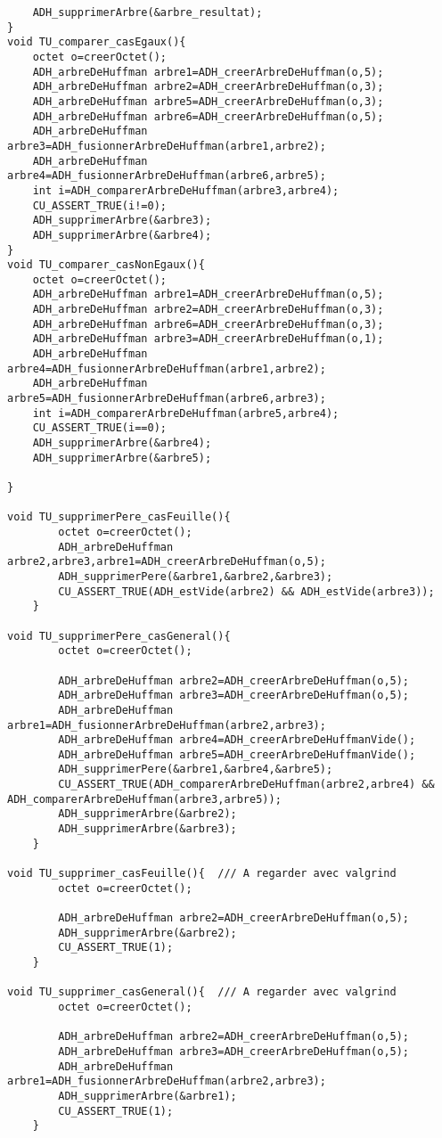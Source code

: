 \begin{verbatim}
	ADH_supprimerArbre(&arbre_resultat);
}
void TU_comparer_casEgaux(){
    octet o=creerOctet();
    ADH_arbreDeHuffman arbre1=ADH_creerArbreDeHuffman(o,5);
    ADH_arbreDeHuffman arbre2=ADH_creerArbreDeHuffman(o,3);
    ADH_arbreDeHuffman arbre5=ADH_creerArbreDeHuffman(o,3);
    ADH_arbreDeHuffman arbre6=ADH_creerArbreDeHuffman(o,5);
    ADH_arbreDeHuffman arbre3=ADH_fusionnerArbreDeHuffman(arbre1,arbre2);
    ADH_arbreDeHuffman arbre4=ADH_fusionnerArbreDeHuffman(arbre6,arbre5);
    int i=ADH_comparerArbreDeHuffman(arbre3,arbre4);
    CU_ASSERT_TRUE(i!=0);
	ADH_supprimerArbre(&arbre3);
	ADH_supprimerArbre(&arbre4);
}
void TU_comparer_casNonEgaux(){
    octet o=creerOctet();
    ADH_arbreDeHuffman arbre1=ADH_creerArbreDeHuffman(o,5);
    ADH_arbreDeHuffman arbre2=ADH_creerArbreDeHuffman(o,3);
    ADH_arbreDeHuffman arbre6=ADH_creerArbreDeHuffman(o,3);
    ADH_arbreDeHuffman arbre3=ADH_creerArbreDeHuffman(o,1);
    ADH_arbreDeHuffman arbre4=ADH_fusionnerArbreDeHuffman(arbre1,arbre2);
    ADH_arbreDeHuffman arbre5=ADH_fusionnerArbreDeHuffman(arbre6,arbre3);
    int i=ADH_comparerArbreDeHuffman(arbre5,arbre4);
    CU_ASSERT_TRUE(i==0);
	ADH_supprimerArbre(&arbre4);
	ADH_supprimerArbre(&arbre5);
    
}

void TU_supprimerPere_casFeuille(){
		octet o=creerOctet();
		ADH_arbreDeHuffman arbre2,arbre3,arbre1=ADH_creerArbreDeHuffman(o,5);
		ADH_supprimerPere(&arbre1,&arbre2,&arbre3);
		CU_ASSERT_TRUE(ADH_estVide(arbre2) && ADH_estVide(arbre3));
	}
	
void TU_supprimerPere_casGeneral(){
		octet o=creerOctet();
		
		ADH_arbreDeHuffman arbre2=ADH_creerArbreDeHuffman(o,5);
		ADH_arbreDeHuffman arbre3=ADH_creerArbreDeHuffman(o,5);
		ADH_arbreDeHuffman arbre1=ADH_fusionnerArbreDeHuffman(arbre2,arbre3);
		ADH_arbreDeHuffman arbre4=ADH_creerArbreDeHuffmanVide();
		ADH_arbreDeHuffman arbre5=ADH_creerArbreDeHuffmanVide();
		ADH_supprimerPere(&arbre1,&arbre4,&arbre5);
		CU_ASSERT_TRUE(ADH_comparerArbreDeHuffman(arbre2,arbre4) && ADH_comparerArbreDeHuffman(arbre3,arbre5));
		ADH_supprimerArbre(&arbre2);
		ADH_supprimerArbre(&arbre3);
	}
	
void TU_supprimer_casFeuille(){  /// A regarder avec valgrind
		octet o=creerOctet();
		
		ADH_arbreDeHuffman arbre2=ADH_creerArbreDeHuffman(o,5);
		ADH_supprimerArbre(&arbre2);
		CU_ASSERT_TRUE(1);
	}
	
void TU_supprimer_casGeneral(){  /// A regarder avec valgrind
		octet o=creerOctet();
		
		ADH_arbreDeHuffman arbre2=ADH_creerArbreDeHuffman(o,5);
		ADH_arbreDeHuffman arbre3=ADH_creerArbreDeHuffman(o,5);
		ADH_arbreDeHuffman arbre1=ADH_fusionnerArbreDeHuffman(arbre2,arbre3);
		ADH_supprimerArbre(&arbre1);
		CU_ASSERT_TRUE(1);
	}

\end{verbatim}
 
